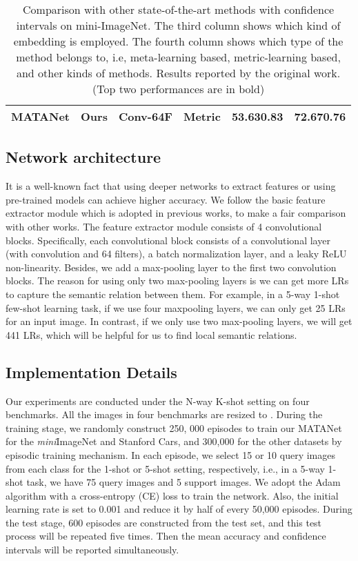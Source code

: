 \documentclass[final]{cvpr}
\begin{document}
\begin{table*}[t]
\begin{tabular}{cccccc}
\midrule
			\textbf{MATANet} &Ours& Conv-64F & Metric &\textbf{53.63}\textbf{\footnotesize{0.83}}  & \textbf{72.67}\textbf{\footnotesize{0.76}} \\
			\bottomrule
		\end{tabular}
		\caption{Comparison with other state-of-the-art methods with  confidence intervals on mini-ImageNet. The third column shows which kind of embedding is employed. The fourth column shows which type of the method belongs to, i.e, meta-learning based, metric-learning based, and other kinds of methods.  Results reported by the original work. (Top two performances are in bold) }
	\end{table*}
	
	
	
	\subsection{Network architecture}
	It is a well-known fact that using deeper networks to extract features or using pre-trained models can achieve higher accuracy. We follow the basic feature extractor module which is adopted in previous works, to make a fair comparison with other works. The feature extractor module  consists of 4 convolutional blocks. Specifically, each convolutional block consists of a convolutional layer (with  convolution and 64 filters), a batch normalization layer, and a leaky ReLU non-linearity. Besides, we add a  max-pooling layer to the first two convolution blocks. The reason for using only two max-pooling layers is we can get more LRs to capture the semantic relation between them. For example, in a 5-way 1-shot few-shot learning task, if we use four maxpooling layers, we can only get 25 LRs for an  input image. In contrast, if we only use two max-pooling layers, we will get 441 LRs, which will be helpful for us to find local semantic relations.
	
	\subsection{Implementation Details}
	Our experiments are conducted under the N-way K-shot setting on four benchmarks. All the images in four benchmarks are resized to . During the training stage, we randomly construct 250, 000 episodes to train our MATANet for the  \emph{mini}ImageNet and Stanford Cars, and 300,000 for the other datasets by episodic training mechanism. In each episode, we select 15 or 10 query images from each class for the 1-shot or 5-shot setting, respectively, i.e., in a 5-way 1-shot task, we have 75 query images and 5 support images. We adopt the Adam algorithm \cite{kingma2014adam} with a cross-entropy (CE) loss to train the network. Also, the initial learning rate is set to 0.001 and reduce it by half of every 50,000 episodes. During the test stage, 600 episodes are constructed from the test set,  and this test process will be repeated five times. Then the mean accuracy and  confidence intervals will be reported simultaneously. 
	
\end{document}
